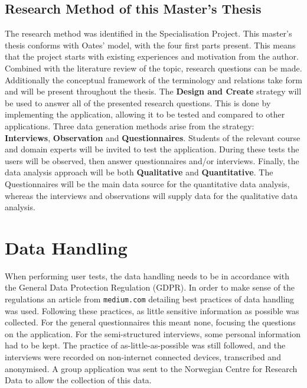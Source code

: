     \SPACE
    
    \subsection*{Research Method of this Master's Thesis}
    The research method was identified in the Specialisation Project\cite{specialisation}. This master's thesis conforms with Oates' model, with the four first parts present. This means that the project starts with existing experiences and motivation from the author. Combined with the literature review of the topic, research questions can be made. Additionally the conceptual framework of the terminology and relations take form and will be present throughout the thesis. The \textbf{Design and Create} strategy will be used to answer all of the presented research questions. This is done by implementing the application, allowing it to be tested and compared to other applications. Three data generation methods arise from the strategy: \textbf{Interviews}, \textbf{Observation} and \textbf{Questionnaires}. Students of the relevant course and domain experts will be invited to test the application. During these tests the users will be observed, then answer questionnaires and/or interviews. Finally, the data analysis approach will be both \textbf{Qualitative} and \textbf{Quantitative}. The Questionnaires will be the main data source for the quantitative data analysis, whereas the interviews and observations will supply data for the qualitative data analysis.

\section{Data Handling}
    When performing user tests, the data handling needs to be in accordance with the General Data Protection Regulation (GDPR)\cite{gdpr_eu}. In order to make sense of the regulations an article from \texttt{medium.com} detailing best practices of data handling was used. Following these practices, as little sensitive information as possible was collected. For the general questionnaires this meant none, focusing the questions on the application. For the semi-structured interviews, some personal information had to be kept. The practice of as-little-as-possible was still followed, and the interviews were recorded on non-internet connected devices, transcribed and anonymised. A group application was sent to the Norwegian Centre for Research Data to allow the collection of this data.
    
